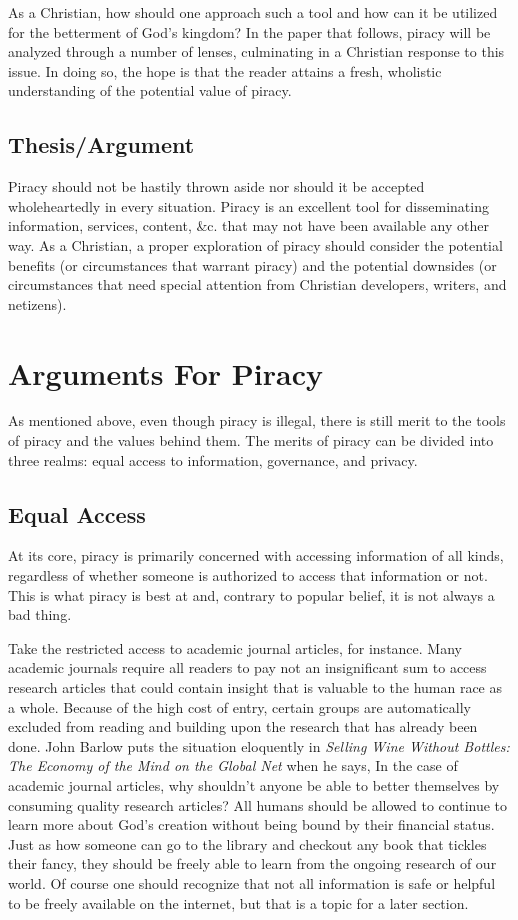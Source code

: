 \documentclass[onecolumn, 12pt]{article}
\begin{document}
\begin{refsection}
As a Christian, how should one approach such a tool and how can it be utilized for the
betterment of God's kingdom? In the paper that follows, piracy will be analyzed through a
number of lenses, culminating in a Christian response to this issue. In doing so, the hope
is that the reader attains a fresh, wholistic understanding of the potential value of
piracy.

\subsection{Thesis/Argument}
Piracy should not be hastily thrown aside nor should it be accepted
wholeheartedly in every situation. Piracy is an excellent tool for
disseminating information, services, content, \&c. that may not have been
available any other way. As a Christian, a proper exploration of piracy should
consider the potential benefits (or circumstances that warrant piracy) and the
potential downsides (or circumstances that need special attention from
Christian developers, writers, and netizens).

\section{Arguments For Piracy}
As mentioned above, even though piracy is illegal, there is still merit to the tools of
piracy and the values behind them. The merits of piracy can be divided into three realms:
equal access to information, governance, and privacy.

\subsection{Equal Access}
At its core, piracy is primarily concerned with accessing information of all kinds,
regardless of whether someone is authorized to access that information or not. This is
what piracy is best at and, contrary to popular belief, it is not always a bad thing. 

Take the restricted access to academic journal articles, for instance. Many academic
journals require all readers to pay not an insignificant sum to access research articles
that could contain insight that is valuable to the human race as a whole. Because of the
high cost of entry, certain groups are automatically excluded from reading and building
upon the research that has already been done. John Barlow puts the situation eloquently in
\textit{Selling Wine Without Bottles: The Economy of the Mind on the Global Net} when he
says,  In the case of academic journal articles, why shouldn't anyone be
able to better themselves by consuming quality research articles? All humans should be
allowed to continue to learn more about God's creation without being bound by their
financial status. Just as how someone can go to the library and checkout any book that
tickles their fancy, they should be freely able to learn from the ongoing research of our
world. Of course one should recognize that not all information is safe or helpful to be
freely available on the internet, but that is a topic for a later section.


\end{refsection}
\end{document}

